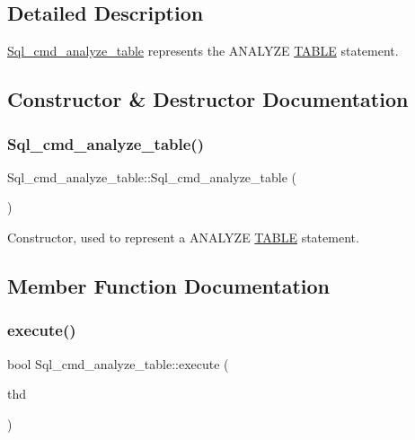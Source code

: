 \subsection{Detailed Description}
\mbox{\hyperlink{classSql__cmd__analyze__table}{Sql\+\_\+cmd\+\_\+analyze\+\_\+table}} represents the A\+N\+A\+L\+Y\+ZE \mbox{\hyperlink{structTABLE}{T\+A\+B\+LE}} statement. 

\subsection{Constructor \& Destructor Documentation}
\mbox{\label{classSql__cmd__analyze__table_a2d5b0a0710c28c4a45f914500ea2fb6e}} 
\subsubsection{\texorpdfstring{Sql\+\_\+cmd\+\_\+analyze\+\_\+table()}{Sql\_cmd\_analyze\_table()}}
{\footnotesize\ttfamily Sql\+\_\+cmd\+\_\+analyze\+\_\+table\+::\+Sql\+\_\+cmd\+\_\+analyze\+\_\+table (\begin{DoxyParamCaption}{ }\end{DoxyParamCaption})\hspace{0.3cm}{\ttfamily [inline]}}

Constructor, used to represent a A\+N\+A\+L\+Y\+ZE \mbox{\hyperlink{structTABLE}{T\+A\+B\+LE}} statement. 

\subsection{Member Function Documentation}
\mbox{\label{classSql__cmd__analyze__table_ab6efba3102a2c21c273245fcd3de28e5}} 
\subsubsection{\texorpdfstring{execute()}{execute()}}
{\footnotesize\ttfamily bool Sql\+\_\+cmd\+\_\+analyze\+\_\+table\+::execute (\begin{DoxyParamCaption}\item[{T\+HD $\ast$}]{thd }\end{DoxyParamCaption})\hspace{0.3cm}{\ttfamily [virtual]}}

